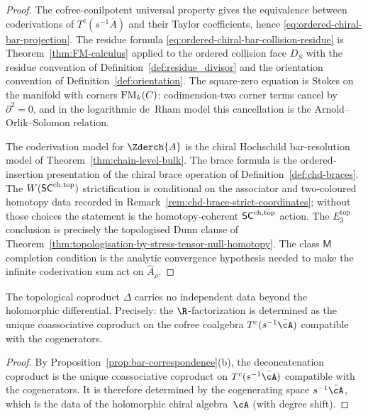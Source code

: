 \begin{proof}
The cofree-conilpotent universal property gives the equivalence
between coderivations of $T^c(s^{-1}\bar A)$ and their Taylor
coefficients, hence \eqref{eq:ordered-chiral-bar-projection}.  The
residue formula \eqref{eq:ordered-chiral-bar-collision-residue} is
Theorem~\ref{thm:FM-calculus} applied to the ordered collision face
$D_S$ with the residue convention of
Definition~\ref{def:residue_divisor} and the orientation convention
of Definition~\ref{def:orientation}.  The square-zero equation is
Stokes on the manifold with corners $\mathrm{FM}_k(C)$: codimension-two
corner terms cancel by $\partial^2=0$, and in the logarithmic
de~Rham model this cancellation is the Arnold--Orlik--Solomon
relation.

The coderivation model for $\Zderch{A}$ is the chiral Hochschild
bar-resolution model of Theorem~\ref{thm:chain-level-bulk}.  The
brace formula is the ordered-insertion presentation of the chiral
brace operation of Definition~\ref{def:chd-braces}.  The
$W(\mathsf{SC}^{\mathrm{ch},\mathrm{top}})$ strictification is conditional on the associator and
two-coloured homotopy data recorded in
Remark~\ref{rem:chd-brace-strict-coordinates}; without those choices
the statement is the homotopy-coherent $\mathsf{SC}^{\mathrm{ch},\mathrm{top}}$ action.  The
$E_3^{\mathrm{top}}$ conclusion is precisely the topologised Dunn
clause of Theorem~\ref{thm:topologisation-by-stress-tensor-null-homotopy}.
The class $\mathsf M$ completion condition is the analytic
convergence hypothesis needed to make the infinite coderivation sum
act on $\widehat A_\rho$.
\end{proof}

\begin{corollary}
\label{cor:R-factorization-lagrangian}
The topological coproduct\/ $\Delta$ carries no independent data
beyond the holomorphic differential. Precisely: the
$\R$-factorization is determined as the unique
coassociative coproduct on the cofree coalgebra\/
$T^c(s^{-1}\bar{\cA})$ compatible with the cogenerators.
\end{corollary}

\begin{proof}
By Proposition~\ref{prop:bar-correspondence}(b), the
deconcatenation coproduct is the unique coassociative coproduct on
$T^c(s^{-1}\bar{\cA})$ compatible with the cogenerators. It is
therefore determined by the cogenerating space
$s^{-1}\bar{\cA}$, which is the data of the holomorphic chiral
algebra~$\cA$ (with degree shift).
\end{proof}

